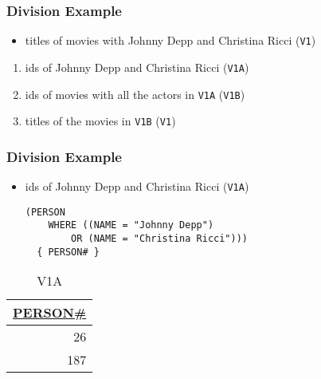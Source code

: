 \documentclass[dvipsnames]{beamer}
\theoremstyle{plain}
\begin{document}
\begin{frame}
  \frametitle{Division Example}

  \begin{itemize}
    \item titles of movies with Johnny Depp and Christina Ricci (\texttt{V1})
  \end{itemize}

  \pause
  \begin{enumerate}
    \item ids of Johnny Depp and Christina Ricci (\texttt{V1A})
    \item ids of movies with all the actors in \texttt{V1A} (\texttt{V1B})
    \item titles of the movies in \texttt{V1B} (\texttt{V1})
  \end{enumerate}
\end{frame}

\begin{frame}[fragile]
  \frametitle{Division Example}

  \begin{itemize}
    \item ids of Johnny Depp and Christina Ricci (\texttt{V1A})
    \begin{lstlisting}
(PERSON
    WHERE ((NAME = "Johnny Depp")
        OR (NAME = "Christina Ricci")))
  { PERSON# }
    \end{lstlisting}
  \end{itemize}

  \vspace{-10pt}
  \begin{tiny}
  \begin{table}
    \caption{V1A}
    \begin{tabular}{|r|}\hline
\underline{PERSON\#}\\[2pt]\hline\hline
                26\\\hline
                187\\\hline
    \end{tabular}
  \end{table}
  \end{tiny}
\end{frame}
\end{document}
